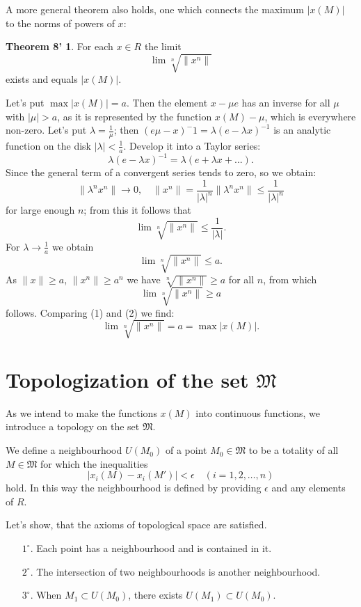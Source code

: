 \documentclass{article}
\theoremstyle{definition}
\begin{document}
A more general theorem also holds, one which connects the maximum $|x(M)|$ to the norms of powers of $x$:
\newtheorem*{theorem8'}{Theorem 8'}
\begin{theorem8'}
  For each $x\in R$ the limit $$\lim\sqrt[n]{\|x^n\|}$$ exists and equals $|x(M)|$.
\end{theorem8'}

Let's put $\max |x(M)| = a$. Then the element $x-\mu e$ has an inverse for all $\mu$ with $|\mu|>a$, as it is represented by the function $x(M)-\mu$, which is everywhere non-zero. Let's put $\lambda=\frac1\mu$; then $(e\mu-x)^-1=\lambda(e-\lambda x)^{-1}$ is an analytic function on the disk $|\lambda|<\frac1a$. Develop it into a Taylor series:
$$ \lambda(e-\lambda x)^{-1} = \lambda(e + \lambda x + ...). $$
Since the general term of a convergent series tends to zero, so we obtain:
$$ \|\lambda^n x^n\| \to 0,\quad \|x^n\| = \frac1{|\lambda|^n}\|\lambda^n x^n\| \leq \frac1{|\lambda|^n} $$
for large enough $n$; from this it follows that
$$ \lim\sqrt[n]{\|x^n\|} \leq \frac1{|\lambda|}. $$
For $\lambda \to \frac1a$ we obtain
\[ \lim\sqrt[n]{\|x^n\|} \leq a. \tag{1} \]
As $\|x\|\geq a$, $\|x^n\|\geq a^n$ we have $\sqrt[n]{\|x^n\|}\geq a$ for all $n$, from which
\[ \lim\sqrt[n]{\|x^n\|} \geq a \tag{2} \]
follows. Comparing (1) and (2) we find:
$$ \lim\sqrt[n]{\|x^n\|} = a = \max |x(M)|. $$

\section{Topologization of the set $\mathfrak{M}$}
As we intend to make the functions $x(M)$ into continuous functions, we introduce a topology on the set $\mathfrak{M}$.

We define a neighbourhood $U(M_0)$ of a point $M_0\in\mathfrak{M}$ to be a totality of all $M\in\mathfrak{M}$ for which the inequalities
$$ |x_i(M) - x_i(M')| < \epsilon \quad (i=1,2,\dots,n)$$
hold. In this way the neighbourhood is defined by providing $\epsilon$ and any elements of $R$.

Let's show, that the axioms of topological space are satisfied.
\begin{enumerate}
\item [$1^\circ$.] Each point has a neighbourhood and is contained in it.
\item [$2^\circ$.] The intersection of two neighbourhoods is another neighbourhood.
\item [$3^\circ$.] When $M_1\subset U(M_0)$, there exists $U(M_1)\subset U(M_0)$.
\end{enumerate}
\end{document}
